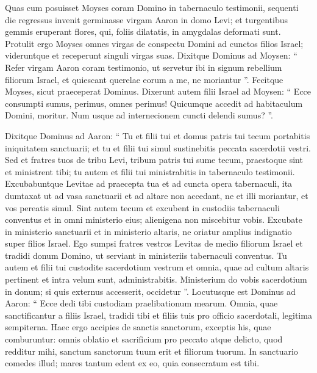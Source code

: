 \begin{biblechapter}
\begin{biblechapter}
\begin{biblechapter}
\begin{biblechapter}
\begin{biblechapter}
\begin{biblechapter}
\begin{biblechapter}
\begin{biblechapter}
\begin{biblechapter}
\begin{biblechapter}
\begin{biblechapter}
\begin{biblechapter}
\begin{biblechapter}
\begin{biblechapter}
\begin{biblechapter}
\begin{biblechapter}
\begin{biblechapter}
\verse Quas cum posuisset Moyses coram Domino in tabernaculo testimonii, 
\verse sequenti die regressus invenit germinasse virgam Aaron in domo Levi; et turgentibus gemmis eruperant flores, qui, foliis dilatatis, in amygdalas deformati sunt. 
\verse Protulit ergo Moyses omnes virgas de conspectu Domini ad cunctos filios Israel; videruntque et receperunt singuli virgas suas.
 \verse Dixitque Dominus ad Moysen: “ Refer virgam Aaron coram testimonio, ut servetur ibi in signum rebellium filiorum Israel, et quiescant querelae eorum a me, ne moriantur ”. 
\verse Fecitque Moyses, sicut praeceperat Dominus.
 \verse Dixerunt autem filii Israel ad Moysen: “ Ecce consumpti sumus, perimus, omnes perimus! 
\verse Quicumque accedit ad habitaculum Domini, moritur. Num usque ad internecionem cuncti delendi sumus? ”.
 
\begin{biblechapter}
\verse Dixitque Dominus ad Aaron: “ Tu et filii tui et domus patris tui tecum portabitis iniquitatem sanctuarii; et tu et filii tui simul sustinebitis peccata sacerdotii vestri. 
\verse Sed et fratres tuos de tribu Levi, tribum patris tui sume tecum, praestoque sint et ministrent tibi; tu autem et filii tui ministrabitis in tabernaculo testimonii. 
\verse Excubabuntque Levitae ad praecepta tua et ad cuncta opera tabernaculi, ita dumtaxat ut ad vasa sanctuarii et ad altare non accedant, ne et illi moriantur, et vos pereatis simul. 
\verse Sint autem tecum et excubent in custodiis tabernaculi conventus et in omni ministerio eius; alienigena non miscebitur vobis. 
\verse Excubate in ministerio sanctuarii et in ministerio altaris, ne oriatur amplius indignatio super filios Israel. 
\verse Ego sumpsi fratres vestros Levitas de medio filiorum Israel et tradidi donum Domino, ut serviant in ministeriis tabernaculi conventus. 
\verse Tu autem et filii tui custodite sacerdotium vestrum et omnia, quae ad cultum altaris pertinent et intra velum sunt, administrabitis. Ministerium do vobis sacerdotium in donum; si quis externus accesserit, occidetur ”.
 \verse Locutusque est Dominus ad Aaron: “ Ecce dedi tibi custodiam praelibationum mearum. Omnia, quae sanctificantur a filiis Israel, tradidi tibi et filiis tuis pro officio sacerdotali, legitima sempiterna. 
\verse Haec ergo accipies de sanctis sanctorum, exceptis his, quae comburuntur: omnis oblatio et sacrificium pro peccato atque delicto, quod redditur mihi, sanctum sanctorum tuum erit et filiorum tuorum.
 \verse In sanctuario comedes illud; mares tantum edent ex eo, quia consecratum est tibi.

\end{biblechapter}
\end{biblechapter}
\end{biblechapter}
\end{biblechapter}
\end{biblechapter}
\end{biblechapter}
\end{biblechapter}
\end{biblechapter}
\end{biblechapter}
\end{biblechapter}
\end{biblechapter}
\end{biblechapter}
\end{biblechapter}
\end{biblechapter}
\end{biblechapter}
\end{biblechapter}
\end{biblechapter}
\end{biblechapter}
